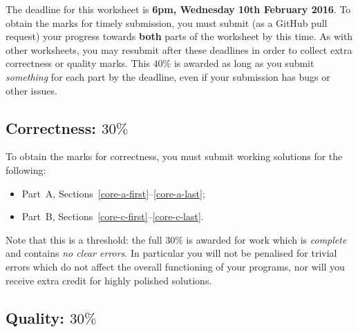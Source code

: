 \documentclass{scrartcl}
\begin{document}
The deadline for this worksheet is \textbf{6pm, Wednesday 10th February 2016}.
To obtain the marks for timely submission, you must submit (as a GitHub pull request) your progress towards \textbf{both} parts of the worksheet by this time.
As with other worksheets, you may resubmit after these deadlines in order to collect extra correctness or quality marks.
This $40\%$ is awarded as long as you submit \emph{something} for each part by the deadline,
even if your submission has bugs or other issues.

\subsection*{Correctness: $30\%$}

To obtain the marks for correctness, you must submit working solutions for the following:
\begin{itemize}
\item Part~A, Sections~\ref{core-a-first}--\ref{core-a-last};
\item Part~B, Sections~\ref{core-c-first}--\ref{core-c-last}.
\end{itemize}
Note that this is a threshold: the full $30\%$ is awarded for work which is \emph{complete}
and contains \emph{no clear errors}. In particular you will not be penalised for trivial errors which do not
affect the overall functioning of your programs, nor will you receive extra credit for highly polished solutions.

\subsection*{Quality: $30\%$}
\end{document}
